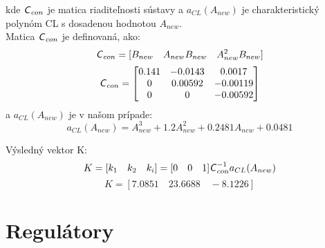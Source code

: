 \documentclass[journal]{IEEEtran}
\begin{document}
kde $\textsf{\textsl{{C}}}_{con}$ je matica riaditeľnosti sústavy a $a_{CL}(A_{new})$ je charakteristický polynóm CL s dosadenou hodnotou $A_{new}$.\\
Matica $\textsf{\textsl{{C}}}_{con}$ je definovaná, ako:
\begin{equation}
\textsf{\textsl{{C}}}_{con} = [B_{new} \quad A_{new}B_{new} \quad A_{new}^2B_{new}]
\end{equation}
\begin{equation}
\textsf{\textsl{{C}}}_{con}=\begin{bmatrix}
0.141 & -0.0143 & 0.0017\\ 0 & 0.00592 & -0.00119\\ 0 & 0 & -0.00592 
\end{bmatrix}
\end{equation}
a $a_{CL}(A_{new})$ je v našom prípade:
\begin{equation}
a_{CL}(A_{new})=A_{new}^3+1.2A_{new}^2+0.2481A_{new}+0.0481
\end{equation}

Výsledný vektor K:
\begin{equation}
K=[k_1\quad k_2\quad k_i]=[0\quad0\quad 1]\textsf{\textsl{{C}}}_{con}^{-1}a_{CL}(A_{new})
\end{equation}
\begin{equation}
K=[7.0851 \quad   23.6688\quad   -8.1226]
\end{equation}


\section{Regulátory}
\end{document}
